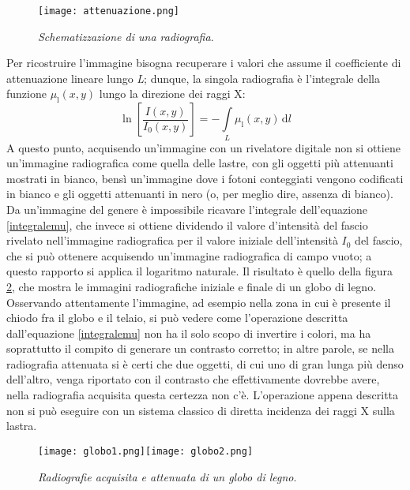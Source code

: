 \documentclass{report}
\newcommand{\figref}[1]{figura \ref{#1}}
\renewcommand{\eqref}[1]{equazione \ref{#1}}
\numberwithin{equation}{section}
\numberwithin{figure}{section}
\begin{document}
\begin{figure}[htp]
\centering
\texttt{[image: attenuazione.png]}
\caption{\label{fig:attenuazione} \textit{Schematizzazione di una radiografia}.}
\end{figure}

\noindent Per ricostruire l'immagine bisogna recuperare i valori che assume il coefficiente di attenuazione lineare lungo \textit{L}; dunque, la singola radiografia è l'integrale della funzione $\mu_\mathrm{l}(x,y)$ lungo la direzione dei raggi X:
\begin{equation}\label{integralemu}
    \boxed{\ln{ \left[ \frac{I(x,y)}{I_0(x,y)} \right]} = -\int\limits_L \mu_\mathrm{l} (x,y)\,\mathrm{d}l}
\end{equation}
A questo punto, acquisendo un'immagine con un rivelatore digitale non si ottiene un'immagine radiografica come quella delle lastre, con gli oggetti più attenuanti mostrati in bianco, bensì un'immagine dove i fotoni conteggiati vengono codificati in bianco e gli oggetti attenuanti in nero (o, per meglio dire, assenza di bianco). Da un'immagine del genere è impossibile ricavare l'integrale dell'\eqref{integralemu}, che invece si ottiene dividendo il valore d'intensità del fascio rivelato nell'immagine radiografica per il valore iniziale dell'intensità $I_0$ del fascio, che si può ottenere acquisendo un'immagine radiografica di campo vuoto; a questo rapporto si applica il logaritmo naturale. Il risultato è quello della \figref{fig:globo}, che mostra le immagini radiografiche iniziale e finale di un globo di legno. Osservando attentamente l'immagine, ad esempio nella zona in cui è presente il chiodo fra il globo e il telaio, si può vedere come l'operazione descritta dall'\eqref{integralemu} non ha il solo scopo di invertire i colori, ma ha soprattutto il compito di generare un contrasto corretto; in altre parole, se nella radiografia attenuata si è certi che due oggetti, di cui uno di gran lunga più denso dell'altro, venga riportato con il contrasto che effettivamente dovrebbe avere, nella radiografia acquisita questa certezza non c'è. L'operazione appena descritta non si può eseguire con un sistema classico di diretta incidenza dei raggi X sulla lastra.

\begin{figure}[htp]
\centering
\texttt{[image: globo1.png]}\quad\texttt{[image: globo2.png]}
\caption{\label{fig:globo} \textit{Radiografie acquisita e attenuata di un globo di legno}.}
\end{figure}
\end{document}
